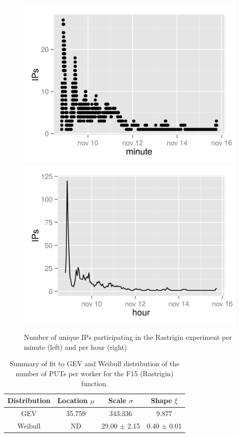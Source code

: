 \documentclass{sig-alternate}
\begin{document}
%
%
\begin{figure}[!htb]
\centering
\includegraphics[width=0.49\linewidth]{rastrigin-IPs.png}
\includegraphics[width=0.49\linewidth]{rastrigin-IPs-hour.png}
\caption{Number of unique IPs participating in the Rastrigin
  experiment per minute (left) and per hour (right)} 
\label{fig:ips:rastrigin}
\end{figure}
%
\begin{table}
\caption{Summary of fit to GEV and Weibull distribution of
  the number of PUTs per worker for the F15 (Rastrigin) function. \label{tab:puts:ww:f15}}
\begin{center}
\begin{tabular}{cccc}
\hline
Distribution & Location $\mu$ & Scale $\sigma$ & Shape $\xi$ \\
\hline
GEV & 35.759  &  343.336   & 9.877 \\
Weibull & ND & 29.00 $\pm$ 2.15  & 0.40 $\pm$ 0.01 \\
\hline
\end{tabular}
\end{center}
\end{table}
%
\end{document}
